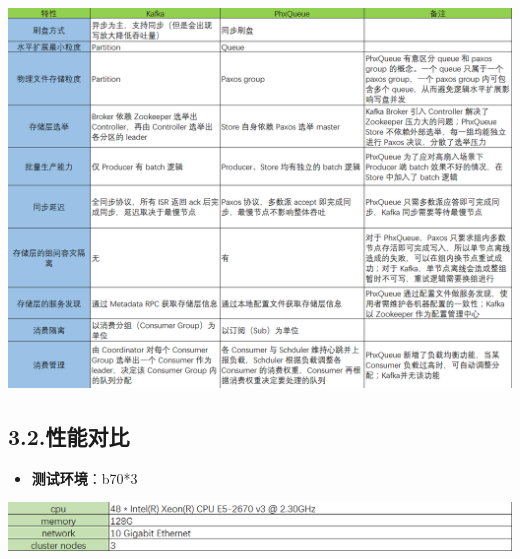 \documentclass{article}
\begin{document}
\noindent{}\includegraphics[keepaspectratio=true,width=\dimmin{}{\dimwidth{0.90}}]{images/-96D645D6-2667-48C2-AE3E-4102FEB3EC8D-}{}%

\subsection{3.2.\hspace*{0.5em}性能对比}\label{section}%

\begin{itemize}[noitemsep,topsep=\mdcompacttopsep]%

\item{}\textbf{测试环境}：b70*3%
\end{itemize}%

\noindent{}\includegraphics[keepaspectratio=true,width=\dimmin{}{\dimwidth{0.90}}]{images/-2709511A-3B33-40CE-A125-DDFAD9C0FF2F-}{}%
\end{document}
